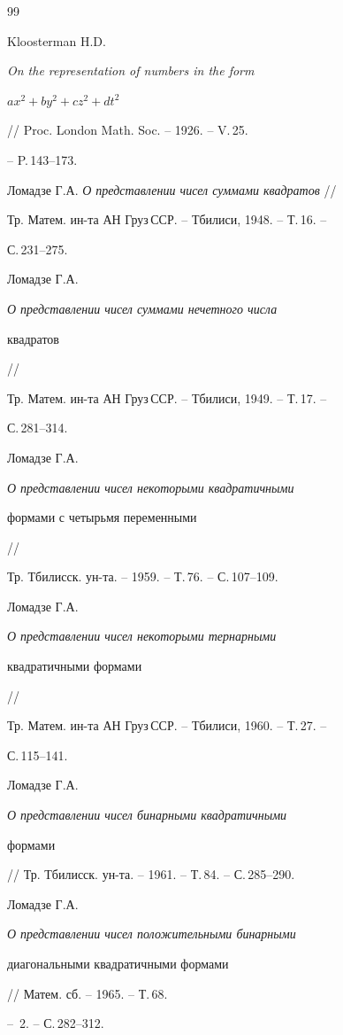 \begin{thebibliography}{99}







Kloosterman H.D. {\em On the representation of numbers in the form


$ax^2+by^2+cz^2+dt^2$} // Proc. London Math. Soc. -- 1926. -- V.\,25.


-- P.\,143--173.




Ломадзе Г.А. {\em О представлении чисел суммами квадратов} //


Тр. Матем. ин-та АН Груз\,ССР. -- Тбилиси, 1948. -- Т.\,16. --


С.\,231--275.




Ломадзе Г.А. {\em О представлении чисел суммами нечетного числа


квадратов} //


Тр. Матем. ин-та АН Груз\,ССР. -- Тбилиси, 1949. -- Т.\,17. --


С.\,281--314.




Ломадзе Г.А. {\em О представлении чисел некоторыми квадратичными


формами с четырьмя переменными} //


Тр. Тбилисск. ун-та. -- 1959. -- Т.\,76. -- С.\,107--109.




Ломадзе Г.А. {\em О представлении чисел некоторыми тернарными


квадратичными формами} //


Тр. Матем. ин-та АН Груз\,ССР. -- Тбилиси, 1960. -- Т.\,27. --


С.\,115--141.




Ломадзе Г.А. {\em О представлении чисел бинарными квадратичными


формами} // Тр. Тбилисск. ун-та. -- 1961. -- Т.\,84. -- С.\,285--290.




Ломадзе Г.А. {\em О представлении чисел положительными бинарными


диагональными квадратичными формами} // Матем. сб. -- 1965. -- Т.\,68.


-- \No\,2. -- С.\,282--312.





\end{thebibliography}
